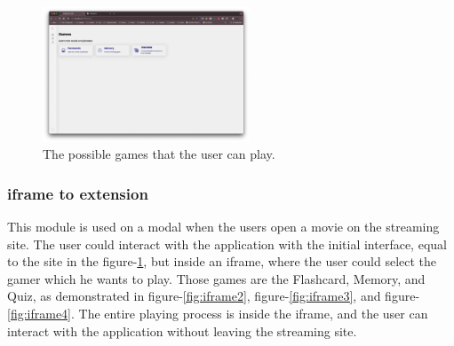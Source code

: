 \documentclass[12pt]{article}
\begin{document}
    \begin{figure}[!h]
      \centering
      \caption{
      The possible games that the user can play.
      }
      \label{fig:site5}
      \includegraphics[width=0.55\textwidth]{assets/5.png}
    \end{figure}





\newpage
\subsubsection{iframe to extension}
      This module is used on a modal when the users open a movie on the streaming site. The user could interact with the application with the initial interface, equal to the site in the figure-\ref{fig:site5}, but inside an iframe, where the user could select the gamer which he wants to play. 
      Those games are the Flashcard, Memory, and Quiz, as demonstrated in figure-\ref{fig:iframe2}, figure-\ref{fig:iframe3}, and figure-\ref{fig:iframe4}.
      The entire playing process is inside the iframe, and the user can interact with the application without leaving the streaming site.
      
      
\end{document}
